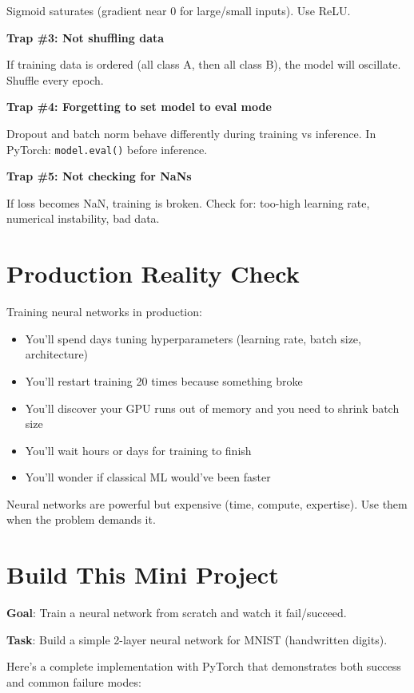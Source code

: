 Sigmoid saturates (gradient near 0 for large/small inputs). Use ReLU.

\textbf{Trap \#3: Not shuffling data}

If training data is ordered (all class A, then all class B), the model will oscillate. Shuffle every epoch.

\textbf{Trap \#4: Forgetting to set model to eval mode}

Dropout and batch norm behave differently during training vs inference. In PyTorch: \texttt{model.eval()} before inference.

\textbf{Trap \#5: Not checking for NaNs}

If loss becomes NaN, training is broken. Check for: too-high learning rate, numerical instability, bad data.

\section{Production Reality Check}

Training neural networks in production:

\begin{itemize}
\item You'll spend days tuning hyperparameters (learning rate, batch size, architecture)
\item You'll restart training 20 times because something broke
\item You'll discover your GPU runs out of memory and you need to shrink batch size
\item You'll wait hours or days for training to finish
\item You'll wonder if classical ML would've been faster
\end{itemize}

Neural networks are powerful but expensive (time, compute, expertise). Use them when the problem demands it.

\section{Build This Mini Project}

\textbf{Goal}: Train a neural network from scratch and watch it fail/succeed.

\textbf{Task}: Build a simple 2-layer neural network for MNIST (handwritten digits).

Here's a complete implementation with PyTorch that demonstrates both success and common failure modes:

